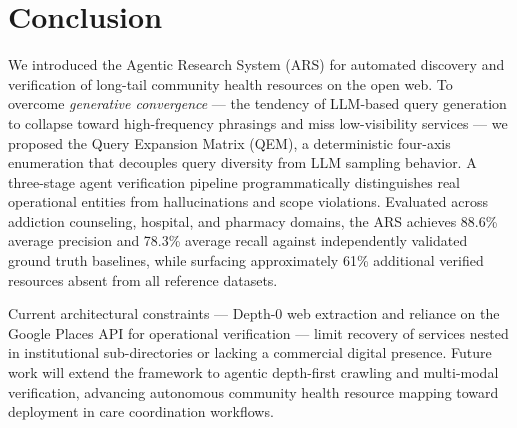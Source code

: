 \documentclass[12pt,oneside]{report}
\begin{document}
\section{Conclusion}
We introduced the Agentic Research System (ARS) for automated discovery and verification of long-tail community health resources on the open web. To overcome \textit{generative convergence} — the tendency of LLM-based query generation to collapse toward high-frequency phrasings and miss low-visibility services — we proposed the Query Expansion Matrix (QEM), a deterministic four-axis enumeration that decouples query diversity from LLM sampling behavior. A three-stage agent verification pipeline programmatically distinguishes real operational entities from hallucinations and scope violations. Evaluated across addiction counseling, hospital, and pharmacy domains, the ARS achieves 88.6\% average precision and 78.3\% average recall against independently validated ground truth baselines, while surfacing approximately 61\% additional verified resources absent from all reference datasets.

Current architectural constraints — Depth-0 web extraction and reliance on the Google Places API for operational verification — limit recovery of services nested in institutional sub-directories or lacking a commercial digital presence. Future work will extend the framework to agentic depth-first crawling and multi-modal verification, advancing autonomous community health resource mapping toward deployment in care coordination workflows.





\end{document}
